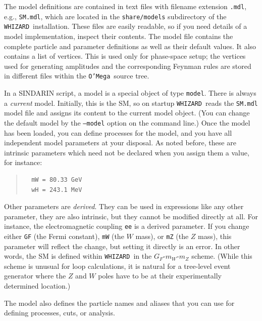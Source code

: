 \documentclass[12pt]{book}
\newcommand{\ttt}[1]{\texttt{#1}}
\newcommand{\whizard}{\texttt{WHIZARD}}
\newcommand{\oMega}{\texttt{O'Mega}}
\begin{document}
The model definitions are contained in text files with filename extension
\ttt{.mdl}, e.g., \ttt{SM.mdl}, which are located in the \ttt{share/models}
subdirectory of the \whizard\ installation.  These files are easily readable,
so if you need details of a model implementation, inspect their contents.  The
model file contains the complete particle and parameter definitions as well as
their default values.  It also contains a list of vertices.  This is used only
for phase-space setup; the vertices used for generating amplitudes and the
corresponding Feynman rules are stored in different files within the
\oMega\ source tree.

In a SINDARIN script, a model is a special object of type \ttt{model}.  There
is always a \emph{current} model.  Initially, this is the SM, so on startup
\whizard\ reads the \ttt{SM.mdl} model file and assigns its content to the
current model object.  (You can change the default model by the \ttt{--model}
option on the command line.)  Once the model has been loaded, you can define
processes for the model, and you have all independent model parameters at your
disposal.  As noted before, these are intrinsic parameters which need not be
declared when you assign them a value, for instance:
\begin{quote}
\begin{footnotesize}
\begin{verbatim}
  mW = 80.33 GeV
  wH = 243.1 MeV  
\end{verbatim}
\end{footnotesize}
\end{quote}
Other parameters are \emph{derived}.  They can be used in expressions like any
other parameter, they are also intrinsic, but they cannot be modified directly
at all.  For instance, the electromagnetic coupling \ttt{ee} is a derived
parameter.  If you change either \ttt{GF} (the Fermi constant), \ttt{mW} (the
$W$ mass), or \ttt{mZ} (the $Z$ mass), this parameter will reflect the change,
but setting it directly is an error.  In other words, the SM is defined within
\whizard\ in the $G_F$-$m_W$-$m_Z$ scheme.  (While this scheme is unusual for
loop calculations, it is natural for a tree-level event generator where the
$Z$ and $W$ poles have to be at their experimentally determined location.)

The model also defines the particle names and aliases that you can use for
defining processes, cuts, or analysis.
\end{document}
